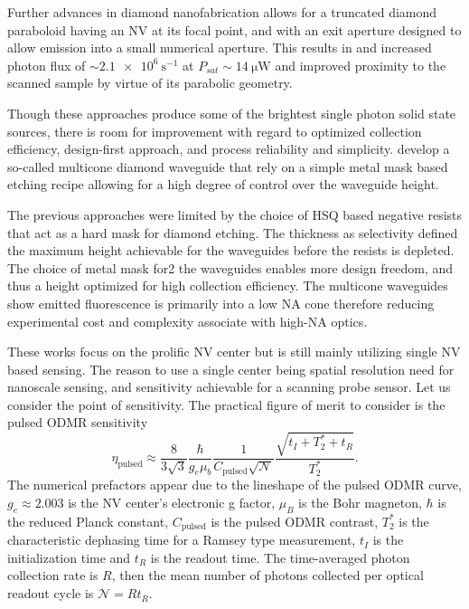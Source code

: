 Further advances in diamond nanofabrication allows for a truncated diamond paraboloid having an \gls{NV} at its focal point, and with an exit aperture designed to allow emission into a small numerical aperture\cite{hedrichParabolicDiamondScanning2020a}. This results in and increased photon flux of $\sim\qty{2.1e6}{\second^{-1}}$ at $P_{sat}\sim\qty{14}{\micro\watt}$ and improved proximity to the scanned sample by virtue of its parabolic geometry.

Though these approaches produce some of the brightest single photon solid state sources, there is room for improvement with regard to optimized collection efficiency, design-first approach, and process reliability and simplicity. \textcite{zhuMulticoneDiamondWaveguides2023a} develop a so-called multicone diamond waveguide that rely on a simple metal mask based etching recipe allowing for a high degree of control over the waveguide height. 

The previous approaches were limited by the choice of \gls{HSQ} based negative resists that act as a hard mask for diamond etching. The thickness as selectivity defined the maximum height achievable for the waveguides before the resists is depleted. The choice of metal mask for2 the waveguides enables more design freedom, and thus a height optimized for high collection efficiency. The multicone waveguides show emitted fluorescence is primarily into a low \gls{NA} cone therefore reducing experimental cost and complexity associate with high-\gls{NA} optics.

These works focus on the prolific \gls{NV} center but is still mainly utilizing single \gls{NV} based sensing. The reason to use a single center being spatial resolution need for nanoscale sensing, and sensitivity achievable for a scanning probe sensor. Let us consider the point of sensitivity. The practical figure of merit to consider is the pulsed \gls{ODMR} sensitivity
\begin{equation}\label{eq:sens_shot}
    \eta_{\text{pulsed}} \approx \frac{8}{3\sqrt{3}} \frac{\hbar}{g_e \mu_b} \frac{1}{C_{\text{pulsed}}\sqrt{\mathscr{N}}} 
    \frac{\sqrt{t_I + T_2^* + t_R}}{T_2^*}.
\end{equation}
The numerical prefactors appear due to the lineshape of the pulsed \gls{ODMR} curve, $g_e \approx 2.003$ is the \gls{NV} center's electronic g factor\cite{dohertyNitrogenvacancyColourCentre2013}, $\mu_B$ is the Bohr magneton, $\hbar$ is the reduced Planck constant, $C_{\text{pulsed}}$ is the pulsed \gls{ODMR} contrast, $T_2^*$ is the characteristic dephasing time for a Ramsey type measurement, $t_I$ is the initialization time and $t_R$ is the readout time. The time-averaged photon collection rate is $R$, then the mean number of photons collected per optical readout cycle is $\mathscr{N}=Rt_R$\cite{barrySensitivityOptimizationNVdiamond2020}. 

